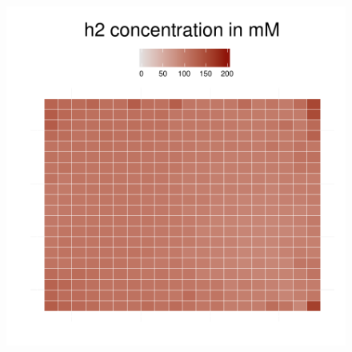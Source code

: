 \begin{figure}[h!]
{\begin{minipage}[t]{0.3\textwidth}
  \end{minipage}
  \begin{minipage}[t]{0.3\textwidth}
    \includegraphics[width=\textwidth]{../results/img/ecoli_beijerinckii_20x20_seed5147_h265.pdf}
  \end{minipage}
  }
\end{figure}
